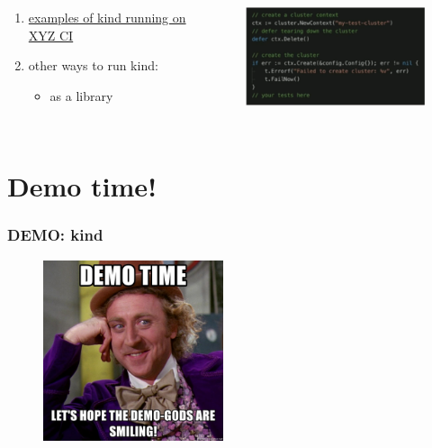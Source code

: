 \documentclass[default]{beamer}
\begin{document}
\begin{frame}
  \begin{columns}
    \column{2in}
    \begin{enumerate}
      \item \href{https://github.com/kind-ci/examples}{examples of kind running on XYZ CI}
      \item other ways to run kind:
      \begin{itemize}
        \item as a library
      \end{itemize}
    \end{enumerate}
    \column{2in}
    \begin{figure}
      \includegraphics[width=190pt,height=100pt]{src/kubecon/static/kind2.png}
    \end{figure}
  \end{columns}
\end{frame}

\section{Demo time!}


\begin{frame}
  \frametitle{DEMO: kind}
  \begin{figure}
    \includegraphics[width=150pt,height=150pt]{src/kubecon/static/demo.jpg}
  \end{figure}
\end{frame}
\end{document}
